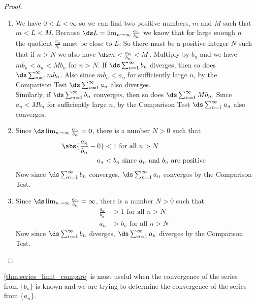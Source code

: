 \begin{proof}\vspace{-.5\baselineskip}
\begin{enumerate}
\item We have $0<L<\infty$ so we can find two positive numbers, $m$ and $M$ such that $m<L<M$. Because $\ds L=\lim_{n\to\infty} \frac{a_n}{b_n}$ we know that for large enough $n$ the quotient $\frac{a_n}{b_n}$ must be close to $L$. So there must be a positive integer $N$ such that if $n>N$ we also have $\ds m<\frac{a_n}{b_n}<M$. Multiply by $b_n$ and we have $mb_n<a_n<Mb_n$ for $n>N$. If $\ds\sum_{n=1}^\infty b_n$\vspace{-.5\baselineskip} diverges, then so does $\ds \sum_{n=1}^\infty mb_n$\vspace{-.3\baselineskip}. Also since $mb_n<a_n$ for sufficiently large $n$, by the Comparison Test $\ds \sum_{n=1}^\infty a_n$\vspace{-.5\baselineskip} also diverges. \\
Similarly, if $\ds \sum_{n=1}^\infty b_n$ converges, then so does $\ds \sum_{n=1}^\infty Mb_n$. Since $a_n<Mb_n$ for sufficiently large $n$, by the Comparison Test $\ds \sum_{n=1}^\infty a_n$ also converges.
\item Since $\ds \lim_{n\to\infty}\frac{a_n}{b_n}=0$, there is a number $N>0$ such that\vspace{-.3\baselineskip}
\begin{align*}
\abs{\frac{a_n}{b_n}-0}&<1\text{ for all }n>N \\
a_n&<b_n\text{ since }a_n\text{ and }b_n\text{ are positive}
\end{align*}
Now since $\ds \sum_{n=1}^\infty b_n$ converges, $\ds \sum_{n=1}^\infty a_n$ converges by the Comparison Test.
\item Since $\ds \lim_{n\to\infty}\frac{a_n}{b_n}=\infty$, there is a number $N>0$ such that\vspace{-.5\baselineskip}
\begin{align*}
\frac{a_n}{b_n}&>1\text{ for all }n>N \\
a_n&>b_n\text{ for all }n>N 
\end{align*}
Now since $\ds \sum_{n=1}^\infty b_n$ diverges, $\ds \sum_{n=1}^\infty a_n$ diverges by the Comparison Test.\qedhere
\end{enumerate}
\end{proof}

\autoref{thm:series_limit_compare} is most useful when the convergence of the series from $\{b_n\}$ is known and we are trying to determine the convergence of the series from $\{a_n\}$. 

